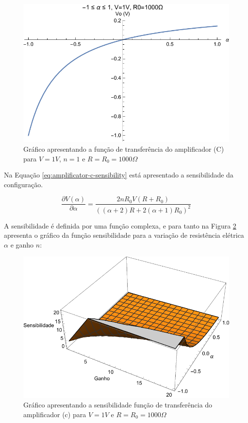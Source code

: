 \documentclass[a4paper]{instrumentacao}
\begin{document}
\begin{figure}[H]
\center
\includegraphics[width=\textwidth]{Amplificador-C-TF.pdf}
\caption{Gráfico apresentando a função de transferência do amplificador (C) para $V=1V$, $n=1$ e $R = R_0 = 1000\Omega$}
\label{fig:amplificador-c-tf}
\end{figure}

Na Equação \ref{eq:amplificator-c-sensibility} está apresentado a sensibilidade da configuração.

\begin{equation}
	\frac{\partial V(\alpha)}{\partial \alpha} = \frac{2 n R_0 V (R+R_0)}{((\alpha +2) R+2 (\alpha +1) R_0)^2}
	\label{eq:amplificator-c-sensibility}
\end{equation}

A sensibilidade é definida por uma função complexa, e para tanto na Figura  \ref{fig:amplificador-c-sensibilidade} apresenta o gráfico da função sensibilidade para a variação de resistência elétrica $\alpha$ e ganho $n$:

\begin{figure}[H]
\center
\includegraphics[width=\textwidth]{Amplificador-C-Sensibility.pdf}
\caption{Gráfico apresentando a sensibilidade função de transferência do amplificador (c) para $V=1V$ e $R = R_0 = 1000\Omega$}
\label{fig:amplificador-c-sensibilidade}
\end{figure}
\end{document}
